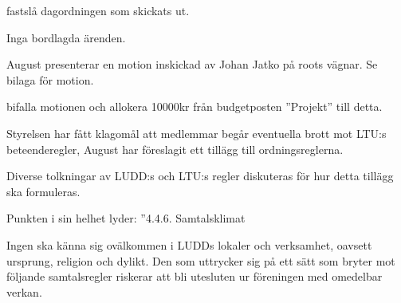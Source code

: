 \documentclass{protokoll}
\begin{document}
\newpage  


\begin{beslut}
     \att fastslå dagordningen som skickats ut.
\end{beslut}

Inga bordlagda ärenden.

August presenterar en motion inskickad av Johan Jatko på roots vägnar. Se
bilaga för motion. 
\begin{beslut}
    \att bifalla motionen och allokera 10000kr från budgetposten ''Projekt'' till detta.
\end{beslut}

Styrelsen har fått klagomål att medlemmar begår eventuella brott mot LTU:s 
beteenderegler, August har föreslagit ett tillägg till ordningsreglerna.  

Diverse tolkningar av LUDD:s och LTU:s regler diskuteras för hur detta tillägg
ska formuleras. 

Punkten i sin helhet lyder: 
''4.4.6. Samtalsklimat


Ingen ska känna sig ovälkommen i LUDDs lokaler och verksamhet, oavsett ursprung, religion och dylikt. Den som uttrycker sig på ett sätt som bryter mot följande samtalsregler riskerar att bli utesluten ur föreningen med omedelbar verkan.
\end{document}
